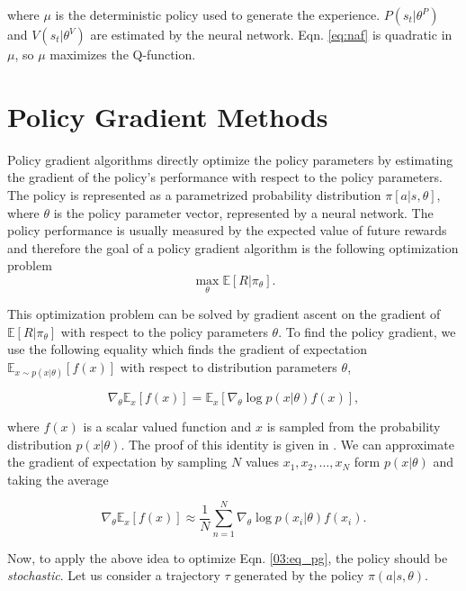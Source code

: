 where $\mu$ is the deterministic policy used to generate the experience. $P(s_t|\theta^P)$ and $V(s_t|\theta^V)$ are estimated by the neural network. Eqn. \ref{eq:naf} is quadratic in $\mu$, so $\mu$ maximizes the Q-function.



\section{Policy Gradient Methods}
Policy gradient algorithms directly optimize the policy parameters by estimating the gradient of the policy's performance with respect to the policy parameters. The policy is represented as a parametrized probability distribution $\pi [a|s, \theta]$, where $\theta$ is the policy parameter vector, represented by a neural network. The policy performance is usually measured by the expected value of future rewards and therefore the goal of a policy gradient algorithm is the following optimization problem
\begin{equation} \label{03:eq_pg}
    \max_\theta \mathbb{E}[R|\pi_\theta].
\end{equation}


\noindent
This optimization problem can be solved by gradient ascent on the gradient of $\mathbb{E}[R|\pi_\theta]$ with respect to the policy parameters $\theta$. To find the policy gradient, we use the following equality which finds the gradient of expectation $\mathbb{E}_{x \sim p(x|\theta)}[f(x)]$ with respect to distribution parameters $\theta$,

\begin{equation} \label{03:eq_pgrad}
\nabla_\theta \mathbb{E}_x[f(x)] = \mathbb{E}_x[\nabla_\theta \log p(x|\theta) f(x)],
\end{equation}


where $f(x)$ is a scalar valued function and $x$ is sampled from the probability distribution $p(x|\theta)$. The proof of this identity is given in \cite{schulman_policy_opt}. We can approximate the gradient of expectation by sampling $N$ values $x_1, x_2,\dots, x_N$ form $p(x|\theta)$ and taking the average

\begin{equation} \label{03:eq_est}
\nabla_\theta \mathbb{E}_x[f(x)] \approx \dfrac{1}{N}\sum_{n=1}^N \nabla_\theta \log p(x_i|\theta) f(x_i).
\end{equation}

\noindent
Now, to apply the above idea to optimize Eqn. \ref{03:eq_pg}, the policy should be \textit{stochastic}. Let us consider a trajectory $\tau$ generated by the policy $\pi(a|s,\theta)$.

